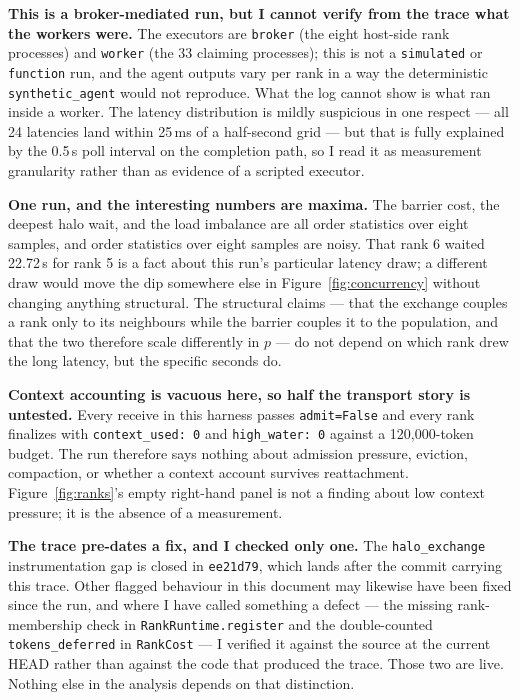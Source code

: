 \documentclass[11pt]{article}
\begin{document}
\textbf{This is a broker-mediated run, but I cannot verify from the trace what the workers
were.} The executors are \texttt{broker} (the eight host-side rank processes) and
\texttt{worker} (the 33 claiming processes); this is not a \texttt{simulated} or
\texttt{function} run, and the agent outputs vary per rank in a way the deterministic
\texttt{synthetic\_agent} would not reproduce. What the log cannot show is what ran inside a
worker. The latency distribution is mildly suspicious in one respect --- all 24 latencies
land within 25\,ms of a half-second grid --- but that is fully explained by the 0.5\,s poll
interval on the completion path, so I read it as measurement granularity rather than as
evidence of a scripted executor.

\textbf{One run, and the interesting numbers are maxima.} The barrier cost, the deepest
halo wait, and the load imbalance are all order statistics over eight samples, and order
statistics over eight samples are noisy. That rank 6 waited 22.72\,s for rank 5 is a fact
about this run's particular latency draw; a different draw would move the dip somewhere
else in Figure~\ref{fig:concurrency} without changing anything structural. The structural
claims --- that the exchange couples a rank only to its neighbours while the barrier couples
it to the population, and that the two therefore scale differently in $p$ --- do not depend
on which rank drew the long latency, but the specific seconds do.

\textbf{Context accounting is vacuous here, so half the transport story is untested.} Every
receive in this harness passes \texttt{admit=False} and every rank finalizes with
\texttt{context\_used: 0} and \texttt{high\_water: 0} against a 120{,}000-token budget. The
run therefore says nothing about admission pressure, eviction, compaction, or whether a
context account survives reattachment. Figure~\ref{fig:ranks}'s empty right-hand panel is
not a finding about low context pressure; it is the absence of a measurement.

\textbf{The trace pre-dates a fix, and I checked only one.} The \texttt{halo\_exchange}
instrumentation gap is closed in \texttt{ee21d79}, which lands after the commit carrying
this trace. Other flagged behaviour in this document may likewise have been fixed since the
run, and where I have called something a defect --- the missing rank-membership check in
\texttt{RankRuntime.register} and the double-counted \texttt{tokens\_deferred} in
\texttt{RankCost} --- I verified it against the source at the current HEAD rather than
against the code that produced the trace. Those two are live. Nothing else in the analysis
depends on that distinction.
\end{document}
